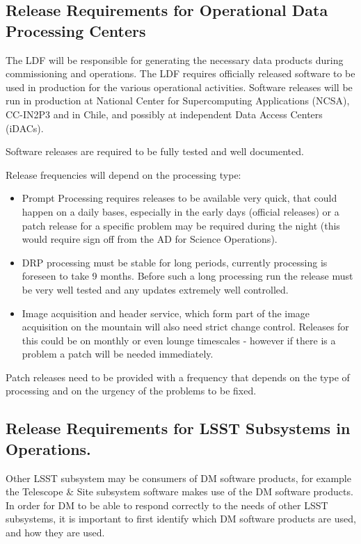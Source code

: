 \subsection{Release Requirements for Operational Data Processing Centers} \label{sec:procreqs}

The \gls{LDF} will be responsible for generating the necessary data products during commissioning and operations.
The \gls{LDF} requires officially released software to be used in production for the various operational activities.
Software releases will be run in production at National \gls{Center} for Supercomputing Applications (\gls{NCSA}), CC-IN2P3 and in Chile, and possibly at independent Data Access Centers (iDACs).

Software releases are required to be fully tested and well documented.

Release frequencies will depend on the processing type:
\begin{itemize}
\item Prompt Processing requires releases to be available very quick, that could happen on a daily bases, especially in the early days (official releases)
 or a  patch release  for a specific problem may be required during the night (this would require sign off from the \gls{AD} for Science \gls{Operations}).
\item \gls{DRP} processing  must be stable for long periods, currently processing is foreseen to take 9 months.  Before such a long processing run the release must be very well tested and any updates extremely well controlled.
\item Image acquisition and header service, which form part of the image acquisition on the mountain will also need strict change control. Releases for this could be on monthly or even lounge timescales - however if there is a problem a patch will be needed immediately.
\end{itemize}

Patch releases need to be provided with a frequency that depends on the type of processing
and on the urgency of the problems to be fixed.


\subsection{Release Requirements for \gls{LSST} Subsystems in \gls{Operations}.} \label{sec:otherreqs}

Other \gls{LSST} subsystem may be consumers of \gls{DM} software products, for example the Telescope \& Site subsystem software makes use of the \gls{DM} software products.
In order for \gls{DM} to be able to respond correctly to the needs of other \gls{LSST} subsystems, it is important to first identify which \gls{DM} software products are used, and how they are used.


